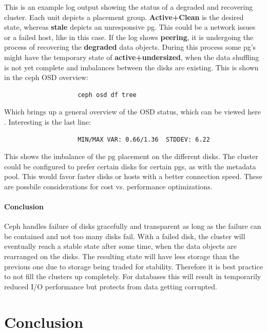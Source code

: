 \documentclass[titlepage, a4paper, 11pt]{scrartcl}
\begin{document}
                This is an example log output showing the status of a degraded and recovering cluster.
                Each unit depicts a placement group. \textbf{Active+Clean} is the desired state, whereas \textbf{stale} depicts an unresponsive pg. This could be a network issues or a failed host, like in this case. If the log shows \textbf{peering}, it is undergoing the process of recovering the \textbf{degraded} data objects. During this process some pg's might have the temporary state of \textbf{active+undersized}, when the data shuffling is not yet complete and imbalances between the disks are existing. This is shown in the ceph OSD overview:

                \begin{lstlisting}
                    ceph osd df tree
                \end{lstlisting}

                Which brings up a general overview of the OSD status, which can be viewed here  \cite{osdoverviewtxtatmainc}. Interesting is the last line:

                \begin{lstlisting}
                    MIN/MAX VAR: 0.66/1.36  STDDEV: 6.22
                \end{lstlisting}

                This shows the imbalance of the pg placement on the different disks. The cluster could be configured to prefer certain disks for certain pgs, as with the metadata pool. This would favor faster disks or hosts with a better connection speed. These are possbile considerations for cost vs. performance optimizations.

                \paragraph{Conclusion} Ceph handles failure of disks gracefully and transparent as long as the failure can be contained and not too many disks fail. With a failed disk, the cluster will eventually reach a stable state after some time, when the data objects are rearranged on the disks. The resulting state will have less storage than the previous one due to storage being traded for stability. Therefore it is best practice to not fill the clusters up completely. For databases this will result in temporarily reduced I/O performance but protects from data getting corrupted.

    \section{Conclusion}\label{conclusion}
\end{document}
